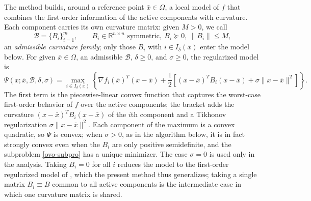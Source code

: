 \documentclass[11pt]{article}
\newcounter{alg}[section]
\begin{document}
The method builds, around a reference point $\bar{x} \in \Omega$, a local model
of $f$ that combines the first-order information of the active components with
curvature. Each component carries its own curvature matrix: given $M > 0$, we
call
\begin{equation*}
    \mathcal{B} = \{ B_i \}_{i=1}^{m}, \qquad
    B_i \in \mathbb{R}^{n \times n} \text{ symmetric},\ B_i \succeq 0,\
    \|B_i\| \leq M,
\end{equation*}
an \textit{admissible curvature family}; only those $B_i$ with
$i \in I_\delta(\bar{x})$ enter the model below. For given $\bar{x} \in \Omega$,
an admissible $\mathcal{B}$, $\delta \geq 0$, and $\sigma \geq 0$, the
regularized model is
\begin{equation}
    \Psi(x; \bar{x}, \mathcal{B}, \delta, \sigma) =
    \max_{i \in I_\delta(\bar{x})}
    \left\lbrace \nabla f_i(\bar{x})^T(x - \bar{x})
    + \frac{1}{2} \left[ (x - \bar{x})^T B_i (x - \bar{x})
    + \sigma \|x - \bar{x}\|^2 \right]\right\rbrace. \label{model}
\end{equation}
The first term is the piecewise-linear convex function that captures the
worst-case first-order behavior of $f$ over the active components; the bracket
adds the curvature $(x - \bar{x})^T B_i (x - \bar{x})$ of the $i$th component
and a Tikhonov regularization $\sigma \|x - \bar{x}\|^2$. Each component of the
maximum is a convex quadratic, so $\Psi$ is convex; when $\sigma > 0$, as in
the algorithm below, it is in fact strongly convex even when the $B_i$ are only
positive semidefinite, and the subproblem \eqref{ovo-subpro} has a unique
minimizer. The case $\sigma = 0$ is used only in the analysis. Taking $B_i = 0$ for all
$i$ reduces the model to the first-order regularized model of
\cite{alvarezovo}, which the present method thus generalizes; taking a single
matrix $B_i \equiv B$ common to all active components is the intermediate case
in which one curvature matrix is shared.
\end{document}
